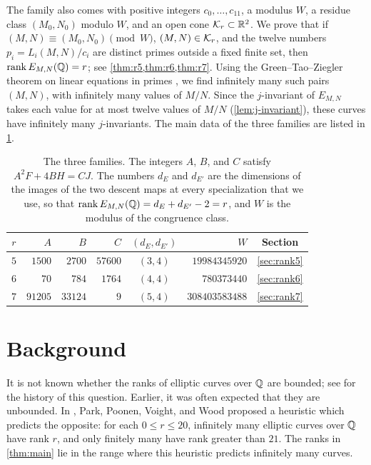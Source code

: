 The family also comes with positive integers $c_0,\dots,c_{11}$, a modulus $W$, a residue class $(M_0,N_0)$ modulo $W$, and an open cone $\mathcal K_r\subset\mathbb R^2$. We prove that if $(M,N)\equiv(M_0,N_0)\pmod W$, $(M,N)\in\mathcal K_r$, and the twelve numbers $p_i=L_i(M,N)/c_i$ are distinct primes outside a fixed finite set, then $\operatorname{rank} E_{M,N}(\mathbb Q)=r$; see \cref{thm:r5,thm:r6,thm:r7}. Using the Green--Tao--Ziegler theorem on linear equations in primes \cite{GT2010,GT2012,GTZ2012}, we find infinitely many such pairs $(M,N)$, with infinitely many values of $M/N$. Since the $j$-invariant of $E_{M,N}$ takes each value for at most twelve values of $M/N$ (\cref{lem:j-invariant}), these curves have infinitely many $j$-invariants. The main data of the three families are listed in \cref{tab:intro-families}.

\begin{table}[ht]
\centering
\begin{tabular}{@{}crrrcrc@{}}
\toprule
$r$ & $A$ & $B$ & $C$ & $(d_E,d_{E'})$ & $W$ & Section\\
\midrule
$5$ & $1500$ & $2700$ & $57600$ & $(3,4)$ & $19984345920$ & \ref{sec:rank5}\\
$6$ & $70$ & $784$ & $1764$ & $(4,4)$ & $780373440$ & \ref{sec:rank6}\\
$7$ & $91205$ & $33124$ & $9$ & $(5,4)$ & $308403583488$ & \ref{sec:rank7}\\
\bottomrule
\end{tabular}
\caption{The three families. The integers $A$, $B$, and $C$ satisfy $A^2F+4BH=CJ$. The numbers $d_E$ and $d_{E'}$ are the dimensions of the images of the two descent maps at every specialization that we use, so that $\operatorname{rank} E_{M,N}(\mathbb Q)=d_E+d_{E'}-2=r$, and $W$ is the modulus of the congruence class.}
\label{tab:intro-families}
\end{table}

\section{Background}\label{sec:intro-background}

It is not known whether the ranks of elliptic curves over $\mathbb Q$ are bounded; see \cite[\S3]{PPVW2019} for the history of this question. Earlier, it was often expected that they are unbounded. In \cite{PPVW2019}, Park, Poonen, Voight, and Wood proposed a heuristic which predicts the opposite: for each $0\le r\le 20$, infinitely many elliptic curves over $\mathbb Q$ have rank $r$, and only finitely many have rank greater than $21$. The ranks in \cref{thm:main} lie in the range where this heuristic predicts infinitely many curves.

